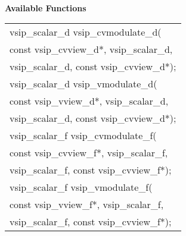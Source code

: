 \\\cvsiplh
\newline \hspace*{.8cm} \vspace*{.1cm} \textbf{Available Functions }
\newline \hspace*{1.1cm} {
\ttfamily
\begin{tabular}[H]{l}
vsip\_scalar\_d vsip\_cvmodulate\_d(\\*\hspace{.6cm}const vsip\_cvview\_d*, vsip\_scalar\_d, \\*\hspace{.6cm}vsip\_scalar\_d, const vsip\_cvview\_d*);\\
vsip\_scalar\_d vsip\_vmodulate\_d(\\*\hspace{.6cm}const vsip\_vview\_d*, vsip\_scalar\_d, \\*\hspace{.6cm}vsip\_scalar\_d, const vsip\_cvview\_d*);\\
vsip\_scalar\_f vsip\_cvmodulate\_f(\\*\hspace{.6cm}const vsip\_cvview\_f*, vsip\_scalar\_f, \\*\hspace{.6cm}vsip\_scalar\_f, const vsip\_cvview\_f*);\\
vsip\_scalar\_f vsip\_vmodulate\_f(\\*\hspace{.6cm}const vsip\_vview\_f*, vsip\_scalar\_f, \\*\hspace{.6cm}vsip\_scalar\_f, const vsip\_cvview\_f*);\\
\end{tabular}
}
\\\pyjvsiph
{}
